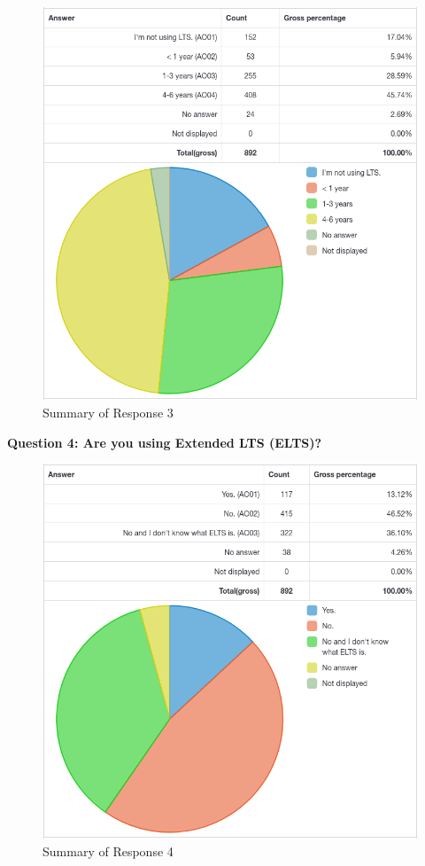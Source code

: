 \documentclass{article}
\begin{document}
\vspace{3mm}
\begin{figure}[h!]
\centering
\includegraphics[width=16.5cm]{assets/3-complete-responses.png}
\caption{Summary of Response 3}
\end{figure}

\newpage

\Large{\textbf{Question 4: Are you using Extended LTS (ELTS)?}}

\vspace{3mm}
\begin{figure}[h!]
\centering
\includegraphics[width=16.5cm]{assets/4-complete-responses.png}
\caption{Summary of Response 4}
\end{figure}
\end{document}
